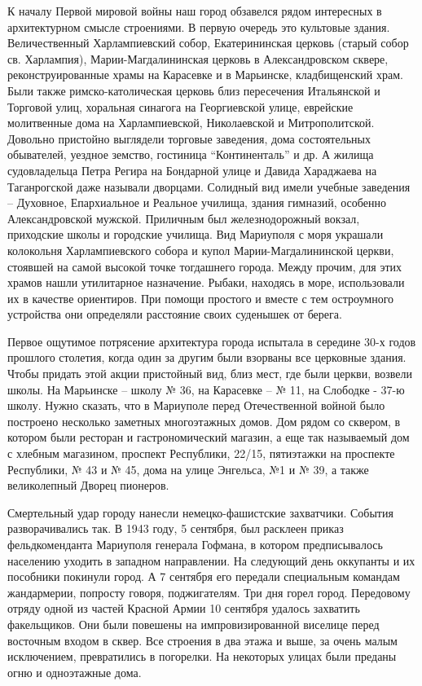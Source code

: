 
К началу Первой мировой войны наш город обзавелся рядом интересных в
архитектурном смысле строениями. В первую очередь это культовые здания.
Величественный Харлампиевский собор, Екатерининская церковь (старый собор св.
Харлампия), Марии-Магдалининская церковь в Александровском сквере,
реконструированные храмы на Карасевке и в Марьинске, кладбищенский храм. Были
также римско-католическая церковь близ пересечения Итальянской и Торговой улиц,
хоральная синагога на Георгиевской улице, еврейские молитвенные дома на
Харлампиевской, Николаевской и Митрополитской. Довольно пристойно выглядели
торговые заведения, дома состоятельных обывателей, уездное земство, гостиница
\enquote{Континенталь} и др. А жилища судовладельца Петра Регира на Бондарной улице и
Давида Хараджаева на Таганрогской даже называли дворцами. Солидный вид имели
учебные заведения – Духовное, Епархиальное и Реальное училища, здания гимназий,
особенно Александровской мужской. Приличным был железнодорожный вокзал,
приходские школы и городские училища. Вид Мариуполя с моря украшали колокольня
Харлампиевского собора и купол Марии-Магдалининской церкви, стоявшей на самой
высокой точке тогдашнего города. Между прочим, для этих храмов нашли
утилитарное назначение. Рыбаки, находясь в море, использовали их в качестве
ориентиров. При помощи простого и вместе с тем остроумного устройства они
определяли расстояние своих суденышек от берега.


Первое ощутимое потрясение архитектура города испытала в середине 30-х годов
прошлого столетия, когда один за другим были взорваны все церковные здания.
Чтобы придать этой акции пристойный вид, близ мест, где были церкви, возвели
школы. На Марьинске – школу № 36, на Карасевке – № 11, на Слободке - 37-ю
школу. Нужно сказать, что в Мариуполе перед Отечественной войной было построено
несколько заметных многоэтажных домов. Дом рядом со сквером, в котором были
ресторан и гастрономический магазин, а еще так называемый дом с хлебным
магазином, проспект Республики, 22/15, пятиэтажки на проспекте Республики, № 43
и № 45, дома на улице Энгельса, №1 и № 39, а также великолепный Дворец
пионеров.


Смертельный удар городу нанесли немецко-фашистские захватчики. События
разворачивались так. В 1943 году, 5 сентября, был расклеен приказ
фельдкоменданта Мариуполя генерала Гофмана, в котором предписывалось населению
уходить в западном направлении. На следующий день оккупанты и их пособники
покинули город. А 7 сентября его передали специальным командам жандармерии,
попросту говоря, поджигателям. Три дня горел город. Передовому отряду одной из
частей Красной Армии 10 сентября удалось захватить факельщиков. Они были
повешены на импровизированной виселице перед восточным входом в сквер. Все
строения в два этажа и выше, за очень малым исключением, превратились в
погорелки. На некоторых улицах были преданы огню и одноэтажные дома.

